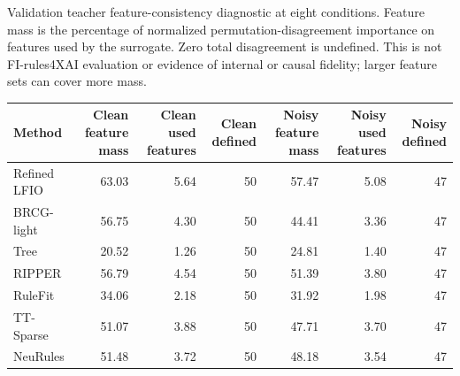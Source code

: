 \begin{kbtable}
\centering
\caption{Validation teacher feature-consistency diagnostic at eight conditions. Feature mass is the percentage of normalized permutation-disagreement importance on features used by the surrogate. Zero total disagreement is undefined. This is not FI-rules4XAI evaluation or evidence of internal or causal fidelity; larger feature sets can cover more mass.}
\label{tab:strength_features}
\small
\begin{adjustbox}{max width=\linewidth}
\begin{tabular}{lrrrrrr}
\toprule
Method & Clean feature mass & Clean used features & Clean defined & Noisy feature mass & Noisy used features & Noisy defined \\
\midrule
Refined LFIO & 63.03 & 5.64 & 50 & 57.47 & 5.08 & 47 \\
BRCG-light & 56.75 & 4.30 & 50 & 44.41 & 3.36 & 47 \\
Tree & 20.52 & 1.26 & 50 & 24.81 & 1.40 & 47 \\
RIPPER & 56.79 & 4.54 & 50 & 51.39 & 3.80 & 47 \\
RuleFit & 34.06 & 2.18 & 50 & 31.92 & 1.98 & 47 \\
TT-Sparse & 51.07 & 3.88 & 50 & 47.71 & 3.70 & 47 \\
NeuRules & 51.48 & 3.72 & 50 & 48.18 & 3.54 & 47 \\
\bottomrule
\end{tabular}
\end{adjustbox}
\end{kbtable}
